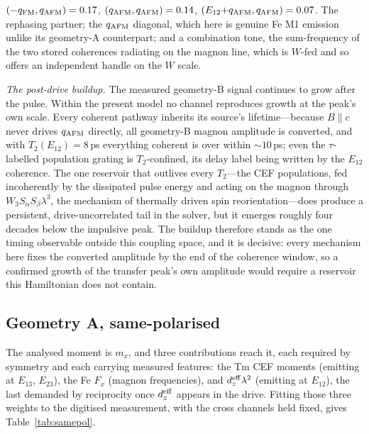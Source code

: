 \documentclass[aps,prb,twocolumn,superscriptaddress,longbibliography]{revtex4-2}
\newcommand{\qafm}{q_{\rm AFM}}
\newcommand{\qfm}{q_{\rm FM}}
\begin{document}
\emph{$(-\qfm,\qafm)=0.17$, $(\qafm,\qafm)=0.14$,
$(E_{12}{+}\qafm,\qafm)=0.07$.}  The rephasing partner; the $\qafm$
diagonal, which here is genuine Fe M1 emission unlike its geometry-A
counterpart; and a combination tone, the sum-frequency of the two stored
coherences radiating on the magnon line, which is $W$-fed and so offers
an independent handle on the $W$ scale.

\emph{The post-drive buildup.}  The measured geometry-B signal continues
to grow after the pulse.  Within the present model no channel reproduces
growth at the peak's own scale.  Every coherent pathway inherits its
source's lifetime---because $B\!\parallel\!c$ never drives $\qafm$
directly, all geometry-B magnon amplitude is converted, and with
$T_2(E_{12})=8$\,ps everything coherent is over within $\sim10$\,ps;
even the $\tau$-labelled population grating is $T_2$-confined, its delay
label being written by the $E_{12}$ coherence.  The one reservoir that
outlives every $T_2$---the CEF populations, fed incoherently by the
dissipated pulse energy and acting on the magnon through
$W_3S_\alpha S_\beta\lambda^3$, the mechanism of thermally driven spin
reorientation---does produce a persistent, drive-uncorrelated tail in
the solver, but it emerges roughly four decades below the impulsive
peak.  The buildup therefore stands as the one timing observable
outside this coupling space, and it is decisive: every mechanism here
fixes the converted amplitude by the end of the coherence window, so a
confirmed growth of the transfer peak's own amplitude would require a
reservoir this Hamiltonian does not contain.

\subsection{Geometry A, same-polarised}

The analysed moment is $m_x$, and three contributions reach it, each
required by symmetry and each carrying measured features: the Tm CEF
moments (emitting at $E_{13}$, $E_{23}$), the Fe $F_x$ (magnon
frequencies), and $d_z^{\rm eff}\lambda^2$ (emitting at $E_{12}$), the
last demanded by reciprocity once $d_z^{\rm eff}$ appears in the drive.
Fitting those three weights to the digitised measurement, with the cross
channels held fixed, gives Table~\ref{tab:samepol}.
\end{document}
